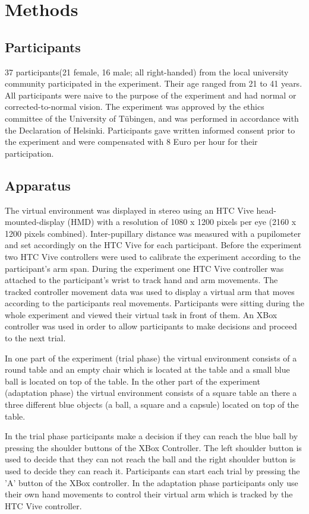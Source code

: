 \section{Methods}

\subsection{Participants}
37 participants(21 female, 16 male; all right-handed) from the local university community participated in the experiment. Their age ranged from 21 to 41 years. All participants were naive to the purpose of the experiment and had normal or corrected-to-normal vision. The experiment was approved by the ethics committee of the University of T\"ubingen, and was performed in accordance with the Declaration of Helsinki. Participants gave written informed consent prior to the experiment and were compensated with 8 Euro per hour for their participation. 

\subsection{Apparatus}
The virtual environment was displayed in stereo using an HTC Vive head-mounted-display (HMD) with a resolution of 1080 x 1200 pixels per eye (2160 x 1200 pixels combined). Inter-pupillary distance was measured with a pupilometer and set accordingly on the HTC Vive for each participant. Before the experiment two HTC Vive controllers were used to calibrate the experiment according to the participant's arm span. During the experiment one HTC Vive controller was attached to the participant's wrist to track hand and arm movements. The tracked controller movement data was used to display a virtual arm that moves according to the participants real movements. Participants were sitting during the whole experiment and viewed their virtual task in front of them. An XBox controller was used in order to allow participants to make decisions and proceed to the next trial.

In one part of the experiment (trial phase) the virtual environment consists of a round table and an empty chair which is located at the table and a small blue ball is located on top of the table. In the other part of the experiment (adaptation phase) the virtual environment consists of a square table an there a three different blue objects (a ball, a square and a capsule) located on top of the table. 


In the trial phase participants make a decision if they can reach the blue ball by pressing the shoulder buttons of the XBox Controller. The left shoulder button is used to decide that they can not reach the ball and the right shoulder button is used to decide they can reach it. Participants can start each trial by pressing the 'A' button of the XBox controller. In the adaptation phase participants only use their own hand movements to control their virtual arm which is tracked by the HTC Vive controller.

